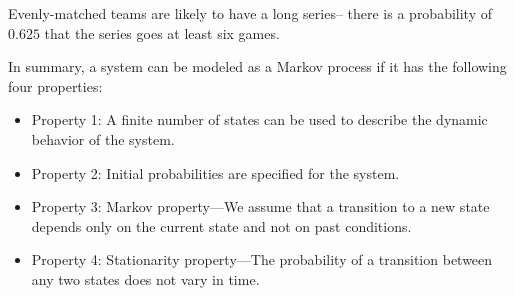 \documentclass[c]{beamer}
\begin{document}
\begin{frame}
\begin{center}
{}
\end{center}

Evenly-matched teams are likely to have a long series-- there
is a probability of $0.625$ that the series goes at least six games.
\end{frame}

\begin{frame}
  In summary, a system can be modeled as a Markov process if it has the following four properties:
  \begin{itemize}
    \item Property 1: A finite number of states can be used to describe the dynamic behavior of the system.
    \item Property 2: Initial probabilities are specified for the system.
    \item Property 3: Markov property—We assume that a transition to a new state depends only on the current state and not on past conditions.
    \item Property 4: Stationarity property—The probability of a transition between any two states does not vary in time.
  \end{itemize}

\end{frame}
\end{document}
